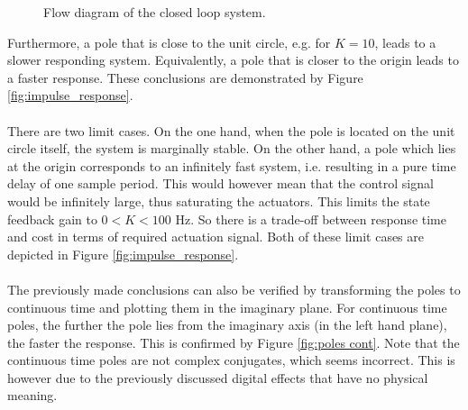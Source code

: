 \documentclass[a4paper,kul]{kulakarticle} %
\begin{document}
\begin{figure}[htp]
	\centering
	\caption{Flow diagram of the closed loop system. \cite{tikz}}
	\label{fig:flowdiagram}
\end{figure}
\newpage
\noindent Furthermore, a pole that is close to the unit circle, e.g. for $K = 10$, leads to a slower responding system. Equivalently, a pole that is closer to the origin leads to a faster response. These conclusions are demonstrated by Figure \ref{fig:impulse_response}. 
\\\\
There are two limit cases. On the one hand, when the pole is located on the unit circle itself, the system is marginally stable. On the other hand, a pole which lies at the origin corresponds to an infinitely fast system, i.e. resulting in a pure time delay of one sample period. This would however mean that the control signal would be infinitely large, thus saturating the actuators. This limits the state feedback gain to $0 < K < 100$ Hz. So there is a trade-off between response time and cost in terms of required actuation signal. Both of these limit cases are depicted in Figure \ref{fig:impulse_response}. 
\\\\
The previously made conclusions can also be verified by transforming the poles to continuous time and plotting them in the imaginary plane. For continuous time poles, the further the pole lies from the imaginary axis (in the left hand plane), the faster the response. This is confirmed by Figure \ref{fig:poles cont}. Note that the continuous time poles are not complex conjugates, which seems incorrect. This is however due to the previously discussed digital effects that have no physical meaning.
\end{document}
